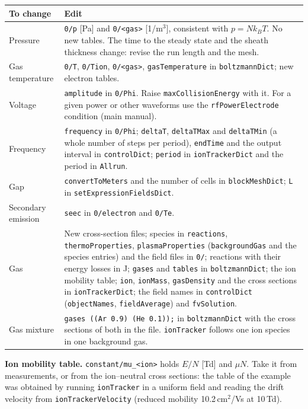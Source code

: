 \documentclass[10pt,a4paper]{article}
\newcommand{\kw}[1]{\texttt{#1}}
\begin{document}
\begin{longtable}{@{}>{\raggedright\arraybackslash}p{3.2cm}>{\raggedright\arraybackslash}p{12.6cm}@{}}
\toprule
To change & Edit \\
\midrule
Pressure &
  \kw{0/p} [Pa] and \kw{0/<gas>} [1/m$^3$], consistent with $p=Nk_BT$. No new
  tables. The time to the steady state and the sheath thickness change:
  revise the run length and the mesh. \\
Gas temperature &
  \kw{0/T}, \kw{0/Tion}, \kw{0/<gas>}, \kw{gasTemperature} in
  \kw{boltzmannDict}; new electron tables. \\
Voltage &
  \kw{amplitude} in \kw{0/Phi}. Raise \kw{maxCollisionEnergy} with it. For a
  given power or other waveforms use the \kw{rfPowerElectrode} condition
  (main manual). \\
Frequency &
  \kw{frequency} in \kw{0/Phi}; \kw{deltaT}, \kw{deltaTMax} and
  \kw{deltaTMin} (a whole number of steps per period), \kw{endTime} and the
  output interval in \kw{controlDict}; \kw{period} in \kw{ionTrackerDict}
  and the period in \kw{Allrun}. \\
Gap &
  \kw{convertToMeters} and the number of cells in \kw{blockMeshDict}; \kw{L}
  in \kw{setExpressionFieldsDict}. \\
Secondary emission &
  \kw{seec} in \kw{0/electron} and \kw{0/Te}. \\
Gas &
  New cross-section files; species in \kw{reactions}, \kw{thermoProperties},
  \kw{plasmaProperties} (\kw{backgroundGas} and the species entries) and the
  field files in \kw{0/}; reactions with their energy losses in J;
  \kw{gases} and \kw{tables} in \kw{boltzmannDict}; the ion mobility table;
  \kw{ion}, \kw{ionMass}, \kw{gasDensity} and the cross sections in
  \kw{ionTrackerDict}; the field names in \kw{controlDict}
  (\kw{objectNames}, \kw{fieldAverage}) and \kw{fvSolution}. \\
Gas mixture &
  \kw{gases ((Ar 0.9) (He 0.1));} in \kw{boltzmannDict} with the cross
  sections of both in the file. \kw{ionTracker} follows one ion species in
  one background gas. \\
\bottomrule
\end{longtable}

\textbf{Ion mobility table.} \kw{constant/mu\_<ion>} holds $E/N$ [Td] and
$\mu N$. Take it from measurements, or from the ion--neutral cross sections:
the table of the example was obtained by running \kw{ionTracker} in a uniform
field and reading the drift velocity from \kw{ionTrackerVelocity} (reduced
mobility 10.2\,cm$^2$/Vs at 10\,Td).
\end{document}

